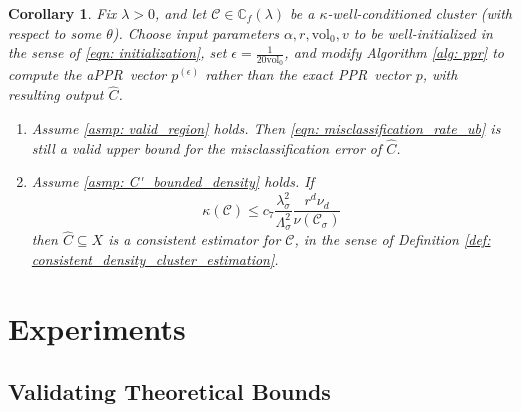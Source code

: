 \documentclass{article}
\newcommand{\vol}{\mathrm{vol}}
\newcommand{\1}{\mathbf{1}}
\newcommand{\pbf}{p}        %
\newcommand{\Xbf}{X}             %
\newcommand{\Cbb}{\mathbb{C}}
\newcommand{\Cset}{\mathcal{C}}
\newcommand{\Csig}{\Cset_{\sigma}}
\newcommand{\Cest}{\widehat{C}}
\newcommand{\pprspace}{{\sc PPR~}}
\theoremstyle{aldenthm}
\newtheorem{corollary}{Corollary}
\theoremstyle{aldenrmrk}
\begin{document}
\begin{corollary}
	\label{cor: appr}
	Fix $\lambda > 0$, and let $\Cset \in \Cbb_f(\lambda)$ be a $\kappa$-well-conditioned cluster (with respect to some $\theta$). Choose input parameters $\alpha, r, \vol_0, v$ to be well-initialized in the sense of \eqref{eqn: initialization}, set $\epsilon = \frac{1}{20 \vol_0}$, and modify Algorithm \ref{alg: ppr} to compute the a\pprspace vector $\pbf^{(\epsilon)}$ rather than the exact \pprspace vector $\pbf$, with resulting output $\Cest$.
	\begin{enumerate}
		\item Assume \ref{asmp: valid_region} holds. Then \eqref{eqn: misclassification_rate_ub} is still a valid upper bound for the misclassification error of $\Cest$.
		\item Assume \ref{asmp: C'_bounded_density} holds. If
		\begin{equation*}
		\kappa(\Cset) \leq c_7 \frac{\lambda_{\sigma}^2}{\Lambda_{\sigma}^2} \frac{r^d \nu_d}{\nu(\Csig)}
		\end{equation*}
		then $\Cest \subseteq \Xbf$ is a consistent estimator for $\Cset$, in the sense of Definition \ref{def: consistent_density_cluster_estimation}.
	\end{enumerate}
\end{corollary}

\section{Experiments}
\label{sec: experiments}

\subsection{Validating Theoretical Bounds}
\end{document}
